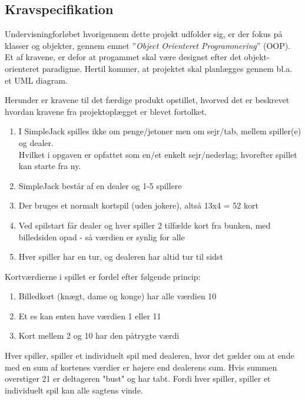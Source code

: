 \documentclass[a4paper]{article}
\begin{document}
  \subsection{Kravspecifikation} \label{ssec:demands}
    Undervisningforløbet hvorigennem dette projekt udfolder sig, er der fokus på klasser og objekter,
    gennem emnet ”\textit{Object Orienteret Programmering}” (OOP).
    Et af kravene, er defor at progammet skal være designet efter det objekt-orienteret paradigme.
    Hertil kommer, at projektet skal planlægges gennem bl.a. et UML diagram.

    Herunder er kravene til det færdige produkt opstillet, hvorved det er beskrevet hvordan kravene fra projektoplægget er blevet fortolket.

    \begin{enumerate}
      \item I SimpleJack spilles ikke om penge/jetoner men om sejr/tab, mellem spiller(e) og dealer.\\
            Hvilket i opgaven er opfattet som en/et enkelt sejr/nederlag; hvorefter spillet kan 
            starte fra ny.
      \item SimpleJack består af en dealer og 1-5 spillere
      \item Der bruges et normalt kortspil (uden jokere), altså 13x4 = 52 kort
      \item Ved spilstart får dealer og hver spiller 2 tilfælde kort fra bunken,
      med billedsiden opad - så værdien er synlig for alle
      \item Hver spiller har en tur, og dealeren har altid tur til sidst
    \end{enumerate}

    Kortværdierne i spillet er fordel efter følgende princip:
    \begin{enumerate}
      \item Billedkort (knægt, dame og konge) har alle værdien 10
      \item Et es kan enten have værdien 1 eller 11
      \item Kort mellem 2 og 10 har den påtrygte værdi
    \end{enumerate}

    Hver spiller, spiller et individuelt spil med dealeren,
    hvor det gælder om at ende med en sum af kortenes værdier er højere end dealerens sum. Hvis summen overstiger 21 er deltageren "bust" og har tabt.
    Fordi hver spiller, spiller et individuelt spil kan alle sagtens vinde.
\end{document}
